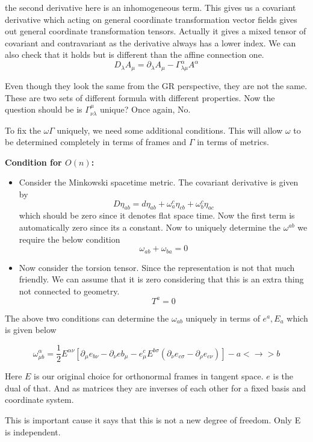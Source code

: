 \documentclass{article}
\begin{document}
the second derivative here is an inhomogeneous term. This gives us a covariant derivative which acting on general coordinate transformation vector fields gives out general coordinate transformation tensors. Actually it gives a mixed tensor of covariant and contravariant as the derivative always has a lower index. We can also check that it holds but is different than the affine connection one. 
\[ D_\lambda A_\mu = \partial_\lambda A_\mu - \Gamma ^\alpha _{\lambda \mu} A^\alpha \]

Even though they look the same from the GR perspective, they are not the same. These are two sets of different formula with different properties. Now the question should be is \( \Gamma^\mu _{\nu \lambda} \) unique?  Once again, No. 

To fix the \( \omega \Gamma\) uniquely, we need some additional conditions. This will allow \( \omega\) to be determined completely in terms of frames and \( \Gamma\) in terms of metrics. 

\textbf{Condition for \(O(n)\):}
\begin{itemize}
    \item Consider the Minkowski spacetime metric. The covariant derivative is given by 
        \[ D \eta_{ab} = d \eta_{ab} + \omega_a^c \eta_{cb} + \omega_b^c \eta_{ac}\]
        which should be zero since it denotes flat space time. Now the first term is automatically zero since its a constant. Now to uniquely determine the \( \omega^{ab}\) we require the below condition 
        \[ \omega_{ab} + \omega_{ba} =0 \]
    \item Now consider the torsion tensor. Since the representation is not that much friendly. We can assume that it is zero considering that this is an extra thing not connected to geometry. 
        \[ T^a = 0\]
\end{itemize}
The above two conditions can determine the \(\omega_{ab}\) uniquely in terms of \(e^a, E_a\) which is given below 

\[ \omega_{\mu b}^\alpha  = \frac{1}{2} E^{\alpha \nu} [ \partial_\mu e_{b\nu} - \partial_\nu e{b_\mu} - e^c_\mu E^{b \sigma} ( \partial_\nu e_{c \sigma} - \partial_\rho e_{c \nu}   )   ] - a <\to> b  \]

Here \( E \) is our original choice for orthonormal frames in tangent space. \( e\) is the dual of that. And as matrices they are inverses of each other for a fixed basis and coordinate system.

This is important cause it says that this is not a new degree of freedom. Only E is independent.
\end{document}
